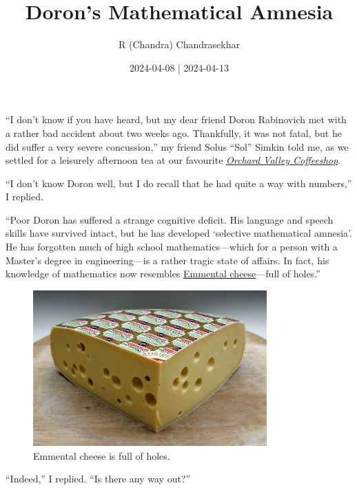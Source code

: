 \documentclass[
  a4paper,
]{article}
\title{Doron's Mathematical Amnesia}
\author{R (Chandra) Chandrasekhar}
\date{2024-04-08 | 2024-04-13}
\begin{document}
\maketitle

\thispagestyle{empty}


``I don't know if you have heard, but my dear friend Doron Rabinovich
met with a rather bad accident about two weeks ago. Thankfully, it was
not fatal, but he did suffer a very severe concussion,'' my friend Solus
``Sol'' Simkin told me, as we settled for a leisurely afternoon tea at
our favourite \href{http://www.orchardvalleycoffee.net/}{\emph{Orchard
Valley Coffeeshop}}.

``I don't know Doron well, but I do recall that he had quite a way with
numbers,'' I replied.

``Poor Doron has suffered a strange cognitive deficit. His language and
speech skills have survived intact, but he has developed `selective
mathematical amnesia'. He has forgotten much of high school
mathematics---which for a person with a Master's degree in
engineering---is a rather tragic state of affairs. In fact, his
knowledge of mathematics now resembles
\href{https://en.wikipedia.org/wiki/Emmental_cheese}{Emmental
cheese}---full of holes.''

\begin{figure}
\centering
\includegraphics[width=0.8\textwidth,height=\textheight]{images/Emmentaler_Premier_Cru.jpg}
\caption[Emmental cheese is full of holes.]{Emmental cheese is full of
holes.\footnotemark{}}\label{fig:cheese}
\end{figure}

``Indeed,'' I replied. ``Is there any way out?''
\end{document}
